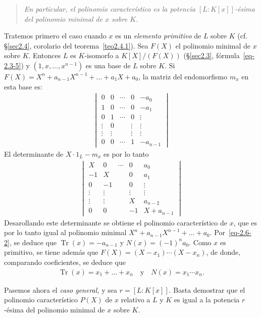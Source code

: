 \documentclass[bibtotoc,leqno,spanish]{amsbook}
\DeclareMathOperator{\Tr}{Tr}
\numberwithin{equation}{section}
\newenvironment{comm}%
	{\begin{quotation}\itshape\Small}
	{\end{quotation}}
\theoremstyle{note}
\theoremstyle{note}
\theoremstyle{rem}
\numberwithin{theorem}{section}
\numberwithin{proposition}{section}
\numberwithin{definition}{section}
\numberwithin{lemma}{section}
\numberwithin{corollary}{section}
\numberwithin{example}{section}
\numberwithin{footnote}{section}%
\begin{document}
\begin{comm}
En particular, el polinomio caracter\'istico es la potencia $[L:K[x]]$-\'esima del
polinomio minimal de $x$
sobre $K$.
\end{comm}

Tratemos primero el caso cuando $x$ es un {\em elemento primitivo} de $L$ sobre $K$
(cf. \S\ref{sec2.4}, corolario del teorema~\ref{teo2.4.1}).
Sea $F(X)$ el polinomio minimal de $x$ sobre $K$. Entonces $L$ es $K$-isomorfo a
$K[X]/(F(X))$ (\S\ref{sec2.3}, f\'ormula~\eqref{eq-2.3-5})
y $(1,x,\dots,x^{n-1})$ es una base de $L$ sobre $K$. Si
$F(X) = X^{n}+a_{n-1}X^{n-1}+\dots+a_{1}X+a_{0}$,
la matriz del endomorfismo $m_{x}$ en esta base es:
\begin{gather*}
\begin{vmatrix}
0 & 0 & \cdots & 0 & -a_{0}\\
1 & 0 & \cdots & 0 & -a_{1}\\
0 & 1 & \cdots & 0 & \vdots\\
\vdots & 0 & & \vdots & \vdots\\
\vdots & \vdots & & \vdots & \vdots\\
0 & 0 & \cdots & 1 & -a_{n-1}
\end{vmatrix}
\end{gather*}
El determinante de $X\cdot 1_{L}-m_{x}$ es por lo tanto
\begin{gather*}
\begin{vmatrix}
X & 0 & \cdots & 0 & a_{0}\\
-1 & X & & 0 & a_{1}\\
0 & -1 & & 0 & \vdots\\
\vdots & \vdots & & \vdots & \vdots\\
\vdots & \vdots & & X & a_{n-2}\\
0 & 0 & & -1 & X+a_{n-1}
\end{vmatrix}
\end{gather*}
Desarollando este determinante se obtiene el polinomio caracter\'istico de $x$, que es por lo tanto igual
al polinomio minimal $X^{n}+a_{n-1}X^{n-1}+\dots+a_{0}$. Por~\eqref{eq-2.6-2}, se deduce que $\Tr(x) = -a_{n-1}$
y $N(x) = (-1)^{n}a_{0}$. Como $x$ es primitivo, se tiene adem\'as que $F(X) = (X-x_{1})\cdots(X-x_{n})$, de
donde, comparando coeficientes, se deduce que
\begin{gather*}
\Tr(x) = x_{1}+\dots+x_{n}\quad\text{y}\quad N(x) = x_{1}\cdots x_{n}.
\end{gather*}

Pasemos ahora el {\em caso general,} y sea $r = [L:K[x]]$. Basta demostrar que el polinomio caracter\'istico
$P(X)$ de $x$ relativo a $L$ y $K$ es igual a la potencia $r$-\'esima del polinomio minimal de $x$ sobre $K$.
\end{document}
